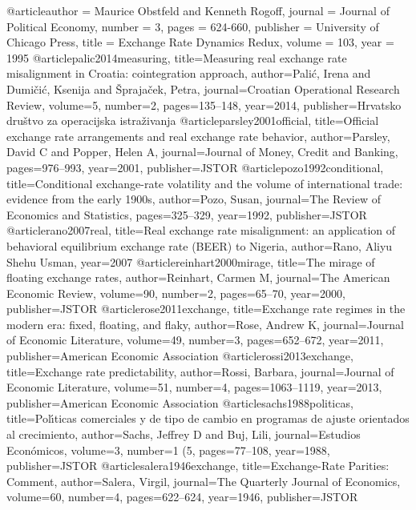 @article{author = {Maurice Obstfeld and Kenneth Rogoff},
 journal = {Journal of Political Economy},
 number = {3},
 pages = {624-660},
 publisher = {University of Chicago Press},
 title = {Exchange Rate Dynamics Redux},
 volume = {103},
 year = {1995}
}
@article{palic2014measuring,
  title={Measuring real exchange rate misalignment in Croatia: cointegration approach},
  author={Pali{\'c}, Irena and Dumi{\v{c}}i{\'c}, Ksenija and {\v{S}}praja{\v{c}}ek, Petra},
  journal={Croatian Operational Research Review},
  volume={5},
  number={2},
  pages={135--148},
  year={2014},
  publisher={Hrvatsko dru{\v{s}}tvo za operacijska istra{\v{z}}ivanja}
}
@article{parsley2001official,
  title={Official exchange rate arrangements and real exchange rate behavior},
  author={Parsley, David C and Popper, Helen A},
  journal={Journal of Money, Credit and Banking},
  pages={976--993},
  year={2001},
  publisher={JSTOR}
}
@article{pozo1992conditional,
  title={Conditional exchange-rate volatility and the volume of international trade: evidence from the early 1900s},
  author={Pozo, Susan},
  journal={The Review of Economics and Statistics},
  pages={325--329},
  year={1992},
  publisher={JSTOR}
}
@article{rano2007real,
  title={Real exchange rate misalignment: an application of behavioral equilibrium exchange rate (BEER) to Nigeria},
  author={Rano, Aliyu Shehu Usman},
  year={2007}
}
@article{reinhart2000mirage,
  title={The mirage of floating exchange rates},
  author={Reinhart, Carmen M},
  journal={The American Economic Review},
  volume={90},
  number={2},
  pages={65--70},
  year={2000},
  publisher={JSTOR}
}
@article{rose2011exchange,
  title={Exchange rate regimes in the modern era: fixed, floating, and flaky},
  author={Rose, Andrew K},
  journal={Journal of Economic Literature},
  volume={49},
  number={3},
  pages={652--672},
  year={2011},
  publisher={American Economic Association}
}
@article{rossi2013exchange,
  title={Exchange rate predictability},
  author={Rossi, Barbara},
  journal={Journal of Economic Literature},
  volume={51},
  number={4},
  pages={1063--1119},
  year={2013},
  publisher={American Economic Association}
}
@article{sachs1988politicas,
  title={Pol{\'\i}ticas comerciales y de tipo de cambio en programas de ajuste orientados al crecimiento},
  author={Sachs, Jeffrey D and Buj, Lili},
  journal={Estudios Econ{\'o}micos},
  volume={3},
  number={1 (5},
  pages={77--108},
  year={1988},
  publisher={JSTOR}
}
@article{salera1946exchange,
  title={Exchange-Rate Parities: Comment},
  author={Salera, Virgil},
  journal={The Quarterly Journal of Economics},
  volume={60},
  number={4},
  pages={622--624},
  year={1946},
  publisher={JSTOR}
}

